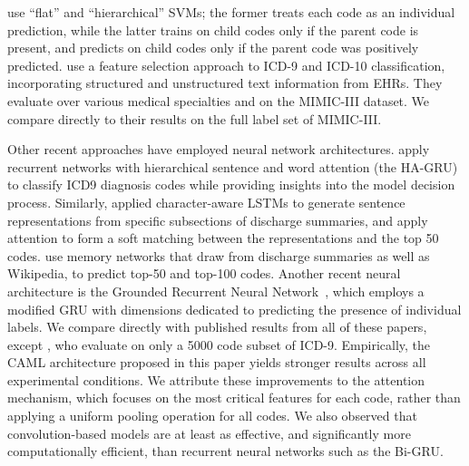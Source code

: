 \documentclass[11pt,a4paper]{article}
\begin{document}
 use ``flat'' and ``hierarchical'' SVMs; the former treats each code as an individual prediction, while the latter trains on child codes only if the parent code is present, and predicts on child codes only if the parent code was positively predicted.  use a feature selection approach to ICD-9 and ICD-10 classification, incorporating structured and unstructured text information from EHRs. They evaluate over various medical specialties and on the MIMIC-III dataset. We compare directly to their results on the full label set of MIMIC-III.

Other recent approaches have employed neural network architectures. 
 apply recurrent networks with hierarchical sentence and word attention (the HA-GRU) to classify ICD9 diagnosis codes while providing insights into the model decision process. Similarly,  applied character-aware LSTMs to generate sentence representations from specific subsections of discharge summaries, and apply attention to form a soft matching between the representations and the top 50 codes.  use memory networks that draw from discharge summaries as well as Wikipedia, to predict top-50 and top-100 codes. Another recent neural architecture is the Grounded Recurrent Neural Network~\cite{vani2017grounded}, which employs a modified GRU with dimensions dedicated to predicting the presence of individual labels. We compare directly with published results from all of these papers, except , who evaluate on only a 5000 code subset of ICD-9. Empirically, the CAML architecture proposed in this paper yields stronger results across all experimental conditions. We attribute these improvements to the attention mechanism, which focuses on the most critical features for each code, rather than applying a uniform pooling operation for all codes. We also observed that convolution-based models are at least as effective, and significantly more computationally efficient, than recurrent neural networks such as the Bi-GRU.
\end{document}
